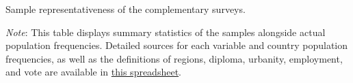 \begin{table}[h!]
    \caption[Sample representativeness of US1, US2, Eu]{Sample representativeness of the complementary surveys.} \label{tab:representativeness_waves}
    \makebox[\textwidth][c]{
        \resizebox*{!}{.80\textheight}{%
        
        }
    }
    {\footnotesize \textit{Note}: This table displays summary statistics of the samples alongside actual population frequencies. %
    Detailed sources for each variable and country population frequencies, as well as the definitions of regions, diploma, urbanity, employment, and vote are available in \href{https://github.com/bixiou/international_attitudes_toward_global_policies/raw/main/questionnaire/specificities.xlsx}{this spreadsheet}. %
    } %
\end{table}

